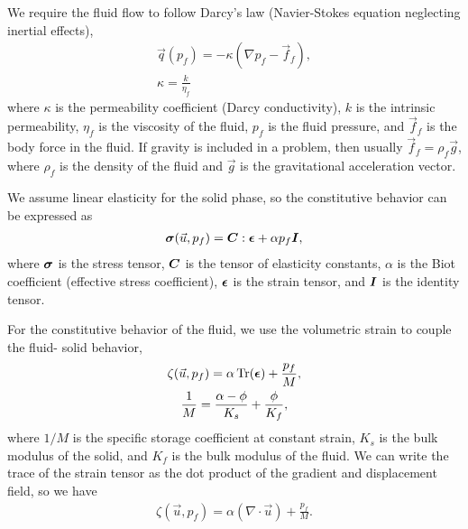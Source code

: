 We require the fluid flow to follow Darcy's law (Navier-Stokes equation neglecting inertial 
effects),
\begin{gather}
  \vec{q}(p_f) = -\kappa (\nabla p_f - \vec{f}_f), \\
%
  \kappa = \frac{k}{\eta_f}
\end{gather}
where $\kappa$ is the permeability coefficient (Darcy conductivity),
$k$ is the intrinsic permeability, $\eta_f$ is the viscosity of the
fluid, $p_f$ is the fluid pressure, and $\vec{f}_f$ is the body force
in the fluid. If gravity is included in a problem, then usually
$\vec{f}_f = \rho_f \vec{g}$, where $\rho_f$ is the density of the
fluid and $\vec{g}$ is the gravitational acceleration vector.

We assume linear elasticity for the solid phase, so the constitutive behavior can be expressed 
as
\begin{gather}
  \bm{\sigma}(\vec{u},p_f) = \bm{C} : \bm{\epsilon} + \alpha p_f \bm{I},
\end{gather}
where $\bm{\sigma}$ is the stress tensor, $\bm{C}$ is the
tensor of elasticity constants, $\alpha$ is the Biot coefficient
(effective stress coefficient), $\bm{\epsilon}$ is the strain
tensor, and $\bm{I}$ is the identity tensor.

For the constitutive behavior of the fluid, we use the volumetric strain to couple the fluid-
solid behavior,
\begin{gather}
  \zeta(\vec{u},p_f) = \alpha \Tr({\tensor{\epsilon}}) + \frac{p_f}{M}, \\
%
  \frac{1}{M} = \frac{\alpha-\phi}{K_s} + \frac{\phi}{K_f},
\end{gather}
where $1/M$ is the specific storage coefficient at constant strain,
$K_s$ is the bulk modulus of the solid, and $K_f$ is the bulk modulus
of the fluid. We can write the trace of the strain tensor as the dot product of the gradient 
and displacement 
field, so we have
\begin{gather}
  \zeta(\vec{u},p_f) = \alpha (\nabla \cdot \vec{u}) + \frac{p_f}{M}.
\end{gather}

